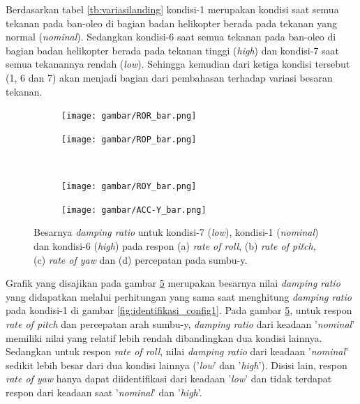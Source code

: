 Berdasarkan tabel \ref{tb:variasilanding} kondisi-1 merupakan kondisi saat semua tekanan pada ban-oleo di bagian badan helikopter berada pada tekanan yang normal (\textit{nominal}). Sedangkan kondisi-6 saat semua tekanan pada ban-oleo di bagian badan helikopter berada pada tekanan tinggi (\textit{high}) dan kondisi-7 saat semua tekanannya rendah (\textit{low}). Sehingga kemudian dari ketiga kondisi tersebut (1, 6 dan 7) akan menjadi bagian dari pembahasan terhadap variasi besaran tekanan.

\begin{figure}[H]
	\centering
	\begin{subfigure}{0.48\textwidth}
		\centering
		\texttt{[image: gambar/ROR\_bar.png]}
		\caption{}
		\label{fig:ROR_1,6,7}
	\end{subfigure}
	\centering
	\begin{subfigure}{0.48\textwidth}
		\centering
		\texttt{[image: gambar/ROP\_bar.png]}
		\caption{}
		\label{fig:ROP_1,6,7}
	\end{subfigure}
	\\
	\centering
	\begin{subfigure}{0.48\textwidth}
		\centering
		\texttt{[image: gambar/ROY\_bar.png]}
		\caption{}
		\label{fig:ROY_1,6,7}
	\end{subfigure}
	\centering
	\begin{subfigure}{0.48\textwidth}
		\centering
		\texttt{[image: gambar/ACC-Y\_bar.png]}
		\caption{}
		\label{fig:ACC-y_1,6,7}
	\end{subfigure}
		\caption{Besarnya \textit{damping ratio} untuk kondisi-7 (\textit{low}), kondisi-1 (\textit{nominal}) dan kondisi-6 (\textit{high}) pada respon (a) \textit{rate of roll}, (b) \textit{rate of pitch}, (c) \textit{rate of yaw} dan (d) percepatan pada sumbu-y.}
		\label{fig:damp_ratio_1,6,7}
\end{figure}

Grafik yang disajikan pada gambar \ref{fig:damp_ratio_1,6,7} merupakan besarnya nilai \textit{damping ratio} yang didapatkan melalui perhitungan yang sama saat menghitung \textit{damping ratio} pada kondisi-1 di gambar \ref{fig:identifikasi_config1}. Pada gambar \ref{fig:damp_ratio_1,6,7}, untuk respon \textit{rate of pitch} dan percepatan arah sumbu-y, \textit{damping ratio} dari keadaan '\textit{nominal}' memiliki nilai yang relatif lebih rendah dibandingkan dua kondisi lainnya. Sedangkan untuk respon \textit{rate of roll}, nilai \textit{damping ratio} dari keadaan '\textit{nominal}' sedikit lebih besar dari dua kondisi lainnya ('\textit{low}' dan '\textit{high}'). Disisi lain, respon \textit{rate of yaw} hanya dapat diidentifikasi dari keadaan '\textit{low}' dan tidak terdapat respon dari keadaan saat '\textit{nominal}' dan '\textit{high}'.

